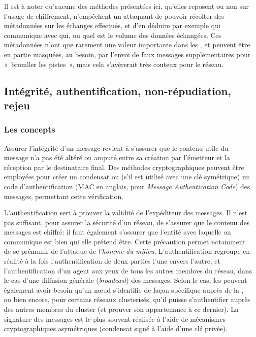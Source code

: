Il est à noter qu'aucune des méthodes présentées ici, qu'elles reposent ou non sur l'usage de chiffrement, n'empêchent un attaquant de pouvoir récolter des métadonnées sur les échanges effectués, et d'en déduire par exemple qui communique avec qui, ou quel est le volume des données échangées.
Ces métadonnées n'ont que rarement une valeur importante dans les \rcs, et peuvent être en partie masquées, au besoin, par l'envoi de faux messages supplémentaires pour « brouiller les pistes », mais cela s'avèrerait très couteux pour le réseau.

\subsection{Intégrité, authentification, non-répudiation, rejeu}

    \subsubsection{Les concepts}
Assurer l'intégrité d'un message revient à s'assurer que le contenu utile du message n'a pas été altéré ou amputé entre sa création par l'émetteur et la réception par le destinataire final.
Des méthodes cryptographiques peuvent être employées pour créer un condensat ou (s'il est utilisé avec une clé symétrique) un code d'authentification (MAC en anglais, pour \textit{Message Authentication Code}) des messages, permettant cette vérification.

L'authentification sert à prouver la validité de l'expéditeur des messages.
Il n'est pas suffisant, pour assurer la sécurité d'un réseau, de s'assurer que le contenu des messages est chiffré: il faut également s'assurer que l'entité avec laquelle on communique est bien qui elle prétend être.
Cette précaution permet notamment de se prémunir de l'attaque de \textit{l'homme du milieu}.
L'authentification regroupe en réalité à la fois l'authentification de deux parties l'une envers l'autre, et l'authentification d'un agent aux yeux de tous les autres membres du réseau, dans le cas d'une diffusion générale (\textit{broadcast}) des messages.
Selon le cas, les \rcs peuvent également avoir besoin qu'un nœud s'identifie de façon spécifique auprès de la \sdb, ou bien encore, pour certains réseaux clusterisés, qu'il puisse s'authentifier auprès des autres membres du cluster (et prouver son appartenance à ce dernier).
La signature des messages est le plus souvent réalisée à l'aide de mécanismes cryptographiques asymétriques (condensat signé à l'aide d'une clé privée).

